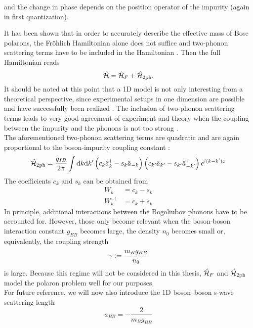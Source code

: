 and the change in phase depends on the position operator of the impurity (again in first quantization).\par
It has been shown that in order to accurately describe the effective mass of Bose polarons, the Fröhlich Hamiltonian alone does not suffice and two-phonon scattering terms have to be included in the Hamiltonian \cite{Grusdt_2017}. Then the full Hamiltonian reads
\begin{equation}\label{full_ham}
\hat{\mathcal{H}} = \hat{\mathcal{H}}_F + \hat{\mathcal{H}}_{2\mathrm{ph}}.
\end{equation}
It should be noted at this point that a 1D model is not only interesting from a theoretical perspective, since experimental setups in one dimension are possible and have successfully been realized \cite{Catani}. The inclusion of two-phonon scattering terms leads to very good agreement of experiment and theory when the coupling between the impurity and the phonons is not too strong \cite{Grusdt_2017}. \\
The aforementioned two-phonon scattering terms are quadratic and are again proportional to the boson-impurity coupling constant \cite{Grusdt_2017, PracticalTraining}:
\begin{equation}
\hat{\mathcal{H}}_{2\mathrm{ph}}=\frac{g_{IB}}{2\pi}\int\mathrm d k\mathrm d k^\prime \left(c_k\hat a^\dagger_k-s_k\hat a_{-k}\right)\left(c_{k^\prime}\hat a_{k^\prime}-s_{k^\prime}\hat a^\dagger_{-k^\prime}\right)e^{i(k-k^\prime)x}
\end{equation}
The coefficients $c_k$ and $s_k$ can be obtained from 
\begin{subequations}
\begin{align}
W_k &= c_k - s_k\\
W_k^{-1} &= c_k + s_k
\end{align}
\end{subequations}
In principle, additional interactions between the Bogoliubov phonons have to be accounted for. However, those only become relevant when the boson-boson interaction constant $g_{BB}$ becomes large, the density $n_0$ becomes small or, equivalently, the coupling strength \begin{equation}\gamma\vcentcolon=\frac{m_B g_{BB}}{n_0}\end{equation} is large. Because this regime will not be considered in this thesis, $\hat{\mathcal{H}}_F$ and $\hat{\mathcal{H}}_{2\mathrm{ph}}$ model the polaron problem well for our purposes.\\
For future reference, we will now also introduce the 1D boson–boson s-wave scattering length 
\begin{equation}
a_{BB}=-\frac{2}{m_Bg_{BB}}
\end{equation}
